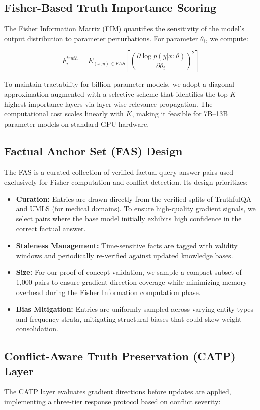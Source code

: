 \documentclass[10pt, conference, letterpaper]{IEEEtran}
\begin{document}
\subsection{Fisher-Based Truth Importance Scoring}
The Fisher Information Matrix (FIM) quantifies the sensitivity of the model's output distribution to parameter perturbations. For parameter $\theta_i$, we compute:

\begin{equation}
F_i^{truth} = E_{(x,y) \in FAS} [ (\frac{\partial \log p(y|x; \theta)}{\partial \theta_i})^2 ]
\end{equation}

To maintain tractability for billion-parameter models, we adopt a diagonal approximation augmented with a selective scheme that identifies the top-$K$ highest-importance layers via layer-wise relevance propagation. The computational cost scales linearly with $K$, making it feasible for 7B--13B parameter models on standard GPU hardware.

\subsection{Factual Anchor Set (FAS) Design}
The FAS is a curated collection of verified factual query-answer pairs used exclusively for Fisher computation and conflict detection. Its design prioritizes:
\begin{itemize}
    \item \textbf{Curation:} Entries are drawn directly from the verified splits of TruthfulQA and UMLS (for medical domains). To ensure high-quality gradient signals, we select pairs where the base model initially exhibits high confidence in the correct factual answer.
    \item \textbf{Staleness Management:} Time-sensitive facts are tagged with validity windows and periodically re-verified against updated knowledge bases.
    \item \textbf{Size:} For our proof-of-concept validation, we sample a compact subset of 1,000 pairs to ensure gradient direction coverage while minimizing memory overhead during the Fisher Information computation phase.
    \item \textbf{Bias Mitigation:} Entries are uniformly sampled across varying entity types and frequency strata, mitigating structural biases that could skew weight consolidation.
\end{itemize}

\subsection{Conflict-Aware Truth Preservation (CATP) Layer}
The CATP layer evaluates gradient directions before updates are applied, implementing a three-tier response protocol based on conflict severity:
\end{document}

